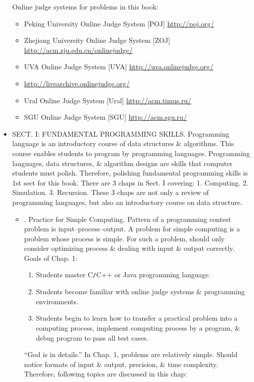 \documentclass{article}
\begin{document}
\begin{itemize}
	 Online judge systems for problems in this book:
	 \begin{itemize}
	 	\item Peking University Online Judge System [POJ] \url{http://poj.org/}
	 	\item Zhejiang University Online Judge System [ZOJ] \url{http://acm.zju.edu.cn/onlinejudge/}
	 	\item UVA Online Judge System [UVA] \url{http://uva.onlinejudge.org/}
	 	\item \url{http://livearchive.onlinejudge.org/}
	 	\item Ural Online Judge System [Ural] \url{http://acm.timus.ru/}
	 	\item SGU Online Judge System [SGU] \url{http://acm.sgu.ru/}
	 \end{itemize}
	\item {\sf SECT. I: FUNDAMENTAL PROGRAMMING SKILLS.} Programming language is an introductory course of data structures \& algorithms. This course enables students to program by programming languages. Programming languages, data structures, \& algorithm designs are skills that computer students must polish. Therefore, polishing fundamental programming skills is 1st sect for this book. There are 3 chaps in Sect. I covering: 1. Computing. 2. Simulation. 3. Recursion. These 3 chaps are not only a review of programming languages, but also an introductory course on data structure.
	\begin{itemize}
		\item {. Practice for Simple Computing.} Pattern of a programming contest problem is input--process--output. A problem for simple computing is a problem whose process is simple. For such a problem, should only consider optimizing process \& dealing with input \& output correctly. Goals of Chap. 1:
		\begin{enumerate}
			\item Students master C{\tt/}C++ or Java programming language.
			\item Students become familiar with online judge systems \& programming environments.
			\item Students begin to learn how to transfer a practical problem into a computing process, implement computing process by a program, \& debug program to pass all test cases.
		\end{enumerate}
		``God is in details.'' In Chap. 1, problems are relatively simple. Should notice formats of input \& output, precision, \& time complexity. Therefore, following topics are discussed in this chap:

\end{itemize}
\end{itemize}
\end{document}
